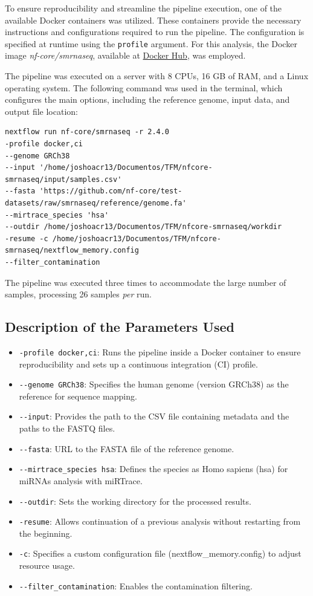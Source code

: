 \documentclass[
  11pt,
  letterpaper,
]{book}
\begin{document}
To ensure reproducibility and streamline the pipeline execution, one of
the available Docker containers was utilized. These containers provide
the necessary instructions and configurations required to run the
pipeline. The configuration is specified at runtime using the
\texttt{profile} argument. For this analysis, the Docker image
\emph{nf-core/smrnaseq}, available at
\href{https://hub.docker.com/r/nfcore/smrnaseq}{Docker Hub}, was
employed.

The pipeline was executed on a server with 8 CPUs, 16 GB of RAM, and a
Linux operating system. The following command was used in the terminal,
which configures the main options, including the reference genome, input
data, and output file location:

\begin{verbatim}
nextflow run nf-core/smrnaseq -r 2.4.0 
-profile docker,ci  
--genome GRCh38  
--input '/home/joshoacr13/Documentos/TFM/nfcore-smrnaseq/input/samples.csv' 
--fasta 'https://github.com/nf-core/test-datasets/raw/smrnaseq/reference/genome.fa' 
--mirtrace_species 'hsa' 
--outdir /home/joshoacr13/Documentos/TFM/nfcore-smrnaseq/workdir  
-resume -c /home/joshoacr13/Documentos/TFM/nfcore-smrnaseq/nextflow_memory.config 
--filter_contamination 
\end{verbatim}

The pipeline was executed three times to accommodate the large number of
samples, processing 26 samples \emph{per} run.

\subsection{Description of the Parameters
Used}\label{description-of-the-parameters-used}

\begin{itemize}
\item
  \texttt{-profile\ docker,ci}: Runs the pipeline inside a Docker
  container to ensure reproducibility and sets up a continuous
  integration (CI) profile.
\item
  \texttt{-\/-genome\ GRCh38}: Specifies the human genome (version
  GRCh38) as the reference for sequence mapping.
\item
  \texttt{-\/-input}: Provides the path to the CSV file containing
  metadata and the paths to the FASTQ files.
\item
  \texttt{-\/-fasta}: URL to the FASTA file of the reference genome.
\item
  \texttt{-\/-mirtrace\_species\ hsa}: Defines the species as Homo
  sapiens (hsa) for miRNAs analysis with miRTrace.
\item
  \texttt{-\/-outdir}: Sets the working directory for the processed
  results.
\item
  \texttt{-resume}: Allows continuation of a previous analysis without
  restarting from the beginning.
\item
  \texttt{-c}: Specifies a custom configuration file
  (nextflow\_memory.config) to adjust resource usage.
\item
  \texttt{-\/-filter\_contamination}: Enables the contamination
  filtering.
\end{itemize}
\end{document}
